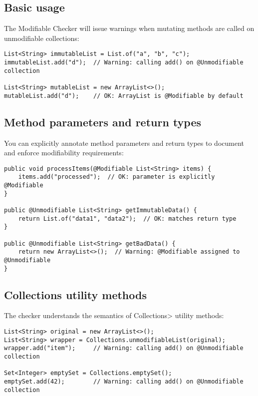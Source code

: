 \subsection{Basic usage}

The Modifiable Checker will issue warnings when mutating methods are called
on unmodifiable collections:

\begin{Verbatim}
List<String> immutableList = List.of("a", "b", "c");
immutableList.add("d");  // Warning: calling add() on @Unmodifiable collection

List<String> mutableList = new ArrayList<>();
mutableList.add("d");    // OK: ArrayList is @Modifiable by default
\end{Verbatim}

\subsection{Method parameters and return types}

You can explicitly annotate method parameters and return types to document
and enforce modifiability requirements:

\begin{Verbatim}
public void processItems(@Modifiable List<String> items) {
    items.add("processed");  // OK: parameter is explicitly @Modifiable
}

public @Unmodifiable List<String> getImmutableData() {
    return List.of("data1", "data2");  // OK: matches return type
}

public @Unmodifiable List<String> getBadData() {
    return new ArrayList<>();  // Warning: @Modifiable assigned to @Unmodifiable
}
\end{Verbatim}

\subsection{Collections utility methods}

The checker understands the semantics of \<Collections> utility methods:

\begin{Verbatim}
List<String> original = new ArrayList<>();
List<String> wrapper = Collections.unmodifiableList(original);
wrapper.add("item");     // Warning: calling add() on @Unmodifiable collection

Set<Integer> emptySet = Collections.emptySet();
emptySet.add(42);        // Warning: calling add() on @Unmodifiable collection
\end{Verbatim}

